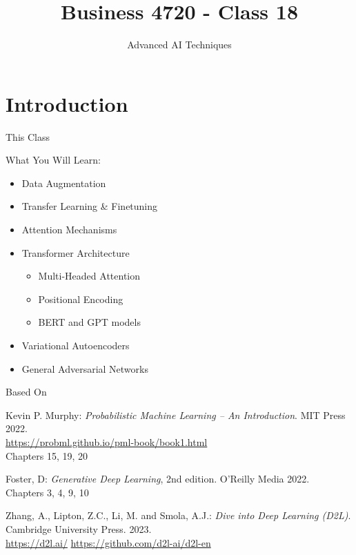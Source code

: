 \documentclass[ignorenonframetext,xcolor=x11names]{beamer}
\title{Business 4720 - Class 18}
\subtitle{Advanced AI Techniques}
\begin{document}
\begin{frame}{}
  \titlepage
  \footnotesize
  
\end{frame}

\section{Introduction}

\begin{frame}{This Class}

\begin{block}{What You Will Learn:}
\begin{itemize}
  \item Data Augmentation
  \item Transfer Learning \& Finetuning
  \item Attention Mechanisms
  \item Transformer Architecture
  \begin{itemize}
     \item Multi-Headed Attention
     \item Positional Encoding
     \item BERT and GPT models
  \end{itemize}
  \item Variational Autoencoders
  \item General Adversarial Networks
\end{itemize}
\end{block}
\end{frame}

\begin{frame}{Based On}
\begin{block}{}
Kevin P. Murphy: \emph{Probabilistic Machine Learning -- An Introduction}. MIT Press 2022. \\
\vspace{0.5\baselineskip}
\url{https://probml.github.io/pml-book/book1.html} \\
\vspace{0.5\baselineskip}
Chapters 15, 19, 20
\end{block}

\begin{block}{}
Foster, D: \emph{Generative Deep Learning}, 2nd edition. O'Reilly Media 2022. \\
\vspace{0.5\baselineskip}
Chapters 3, 4, 9, 10
\end{block}

\begin{block}{}
Zhang, A., Lipton, Z.C., Li, M. and Smola, A.J.: \emph{Dive into Deep Learning (D2L)}. Cambridge University Press. 2023. \\

\url{https://d2l.ai/} \url{https://github.com/d2l-ai/d2l-en}
\end{block}


\end{frame}
\end{document}
